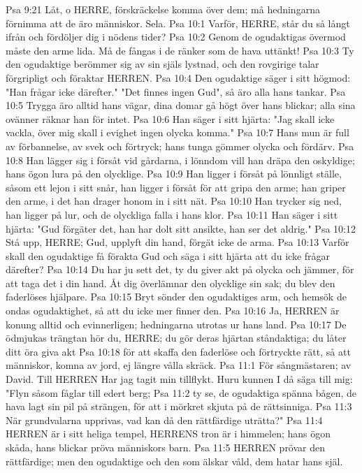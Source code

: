 Psa 9:21  Låt, o HERRE, förskräckelse komma över dem; må hedningarna förnimma att de äro människor. Sela.
Psa 10:1  Varför, HERRE, står du så långt ifrån och fördöljer dig i nödens tider?
Psa 10:2  Genom de ogudaktigas övermod måste den arme lida. Må de fångas i de ränker som de hava uttänkt!
Psa 10:3  Ty den ogudaktige berömmer sig av sin själs lystnad, och den rovgirige talar förgripligt och föraktar HERREN.
Psa 10:4  Den ogudaktige säger i sitt högmod: "Han frågar icke därefter." "Det finnes ingen Gud", så äro alla hans tankar.
Psa 10:5  Trygga äro alltid hans vägar, dina domar gå högt över hans blickar; alla sina ovänner räknar han för intet.
Psa 10:6  Han säger i sitt hjärta: "Jag skall icke vackla, över mig skall i evighet ingen olycka komma."
Psa 10:7  Hans mun är full av förbannelse, av svek och förtryck; hans tunga gömmer olycka och fördärv.
Psa 10:8  Han lägger sig i försåt vid gårdarna, i lönndom vill han dräpa den oskyldige; hans ögon lura på den olycklige.
Psa 10:9  Han ligger i försåt på lönnligt ställe, såsom ett lejon i sitt snår, han ligger i försåt för att gripa den arme; han griper den arme, i det han drager honom in i sitt nät.
Psa 10:10  Han trycker sig ned, han ligger på lur, och de olyckliga falla i hans klor.
Psa 10:11  Han säger i sitt hjärta: "Gud förgäter det, han har dolt sitt ansikte, han ser det aldrig."
Psa 10:12  Stå upp, HERRE; Gud, upplyft din hand, förgät icke de arma.
Psa 10:13  Varför skall den ogudaktige få förakta Gud och säga i sitt hjärta att du icke frågar därefter?
Psa 10:14  Du har ju sett det, ty du giver akt på olycka och jämmer, för att taga det i din hand. Åt dig överlämnar den olycklige sin sak; du blev den faderlöses hjälpare.
Psa 10:15  Bryt sönder den ogudaktiges arm, och hemsök de ondas ogudaktighet, så att du icke mer finner den.
Psa 10:16  Ja, HERREN är konung alltid och evinnerligen; hedningarna utrotas ur hans land.
Psa 10:17  De ödmjukas trängtan hör du, HERRE; du gör deras hjärtan ståndaktiga; du låter ditt öra giva akt
Psa 10:18  för att skaffa den faderlöse och förtryckte rätt, så att människor, komna av jord, ej längre vålla skräck.
Psa 11:1  För sångmästaren; av David. Till HERREN Har jag tagit min tillflykt. Huru kunnen I då säga till mig: "Flyn såsom fåglar till edert berg;
Psa 11:2  ty se, de ogudaktiga spänna bågen, de hava lagt sin pil på strängen, för att i mörkret skjuta på de rättsinniga.
Psa 11:3  När grundvalarna upprivas, vad kan då den rättfärdige uträtta?"
Psa 11:4  HERREN är i sitt heliga tempel, HERRENS tron är i himmelen; hans ögon skåda, hans blickar pröva människors barn.
Psa 11:5  HERREN prövar den rättfärdige; men den ogudaktige och den som älskar våld, dem hatar hans själ.
